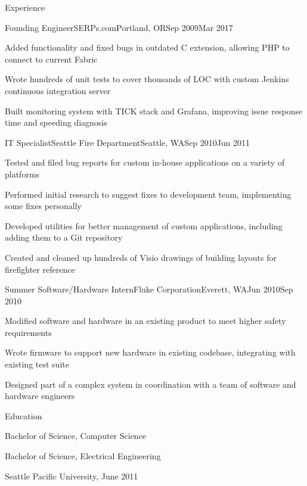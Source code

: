 \documentclass[letterpaper,12pt]{article}
\begin{document}
\begin{paracol}{2}
\begin{res_section}{Experience}
\begin{res_experienceitem}{Founding Engineer}{SERPs.com}{Portland, OR}{Sep 2009}{Mar 2017}
  \item Added functionality and fixed bugs in outdated C extension, allowing PHP to connect to current Fabric
  \item Wrote hundreds of unit tests to cover thousands of LOC with custom Jenkins continuous integration server
  \item Built monitoring system with TICK stack and Grafana, improving issue response time and speeding diagnosis
\end{res_experienceitem}
\begin{res_experienceitem}{IT Specialist}{Seattle Fire Department}{Seattle, WA}{Sep 2010}{Jun 2011}
  \item Tested and filed bug reports for custom in-house applications on a variety of platforms
  \item Performed initial research to suggest fixes to development team, implementing some fixes personally
  \item Developed utilities for better management of custom applications, including adding them to a Git repository
  \item Created and cleaned up hundreds of Visio drawings of building layouts for firefighter reference
\end{res_experienceitem}
\begin{res_experienceitem}{Summer Software/Hardware Intern}{Fluke Corporation}{Everett, WA}{Jun 2010}{Sep 2010}
  \item Modified software and hardware in an existing product to meet higher safety requirements
  \item Wrote firmware to support new hardware in existing codebase, integrating with existing test suite
  \item Designed part of a complex system in coordination with a team of software and hardware engineers
\end{res_experienceitem}
\end{res_section}

\begin{res_section}{Education}
\begin{res_content}{Bachelor of Science, Computer Science

  \noindent Bachelor of Science, Electrical Engineering

  \textnormal{
      \sffamily
      \normalsize
      \hfill
      Seattle Pacific University, June 2011}
}
\end{res_content}
\end{res_section}


\end{paracol}
\end{document}
